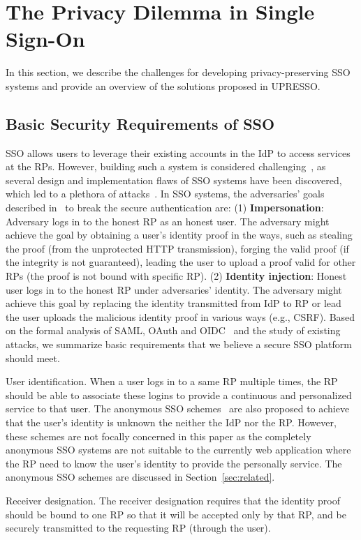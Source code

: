 \section{The Privacy Dilemma in Single Sign-On}
\label{sec:challenge}

In this section, we describe the challenges for developing privacy-preserving SSO systems and provide an overview of the solutions proposed in UPRESSO.



\subsection{Basic Security Requirements of SSO}
\label{subsec:basicrequirements}

SSO allows users to leverage their existing accounts in the IdP to access services at the RPs.
However, building such a system is considered challenging~\cite{SPRESSO}, as several design and implementation flaws of SSO systems have been discovered, which led to a plethora of attacks~\cite{SomorovskyMSKJ12,WangCW12,ArmandoCCCPS13,ZhouE14,WangZLLYLG15,WangZLG16,YangLLZH16,MainkaMS16,MohsenS16,MainkaMSW17,YangLCZ18,YangLS17,ShiWL19}.
In SSO systems, the adversaries' goals described in~\cite{SPRESSO} to break the secure authentication are:
(1) \textbf{Impersonation}: Adversary logs in to the honest RP as an honest user. The adversary might achieve the goal by obtaining a user's identity proof in the ways, such as stealing the proof (from the unprotected HTTP transmission), forging the valid proof (if the integrity is not guaranteed), leading the user to upload a proof valid for other RPs (the proof is not bound with specific RP).
(2) \textbf{Identity injection}: Honest user logs in to the honest RP under adversaries' identity. The adversary might achieve this goal by replacing the identity transmitted from IdP to RP or lead the user uploads the malicious identity proof in various ways (e.g., CSRF).
Based on the formal analysis of SAML, OAuth and OIDC~\cite{ArmandoCCCT08,FettKS16, FettKS17} and the study of existing attacks, we summarize basic requirements that we believe a secure SSO platform should meet.

{\color{red} 
User identification. When a user logs in to a same RP multiple times, the RP should be able to associate these logins to provide a continuous and personalized service to that user. The anonymous SSO schemes~\cite{ElmuftiWRR08,WangWS13,HanCSTW18} are also proposed to achieve that the user's identity is unknown the neither the IdP nor the RP. However, these schemes are not focally concerned in this paper as the completely anonymous SSO systems are not suitable to the currently web application where the RP need to know the user's identity to provide the personally service. The anonymous SSO schemes are discussed in Section~\ref{sec:related}.

Receiver  designation. The receiver  designation requires that the identity proof should be bound to one RP so that it will be accepted only by that RP, and be securely transmitted to the requesting RP (through the user). 
}

